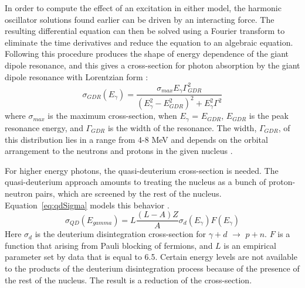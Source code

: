     In order to compute the effect of an excitation in either model, 
      the harmonic oscillator solutions found earlier can be driven by an 
      interacting force.
    The resulting differential equation can then be solved using a Fourier 
      transform to eliminate the time derivatives and reduce the equation to an
      algebraic equation.
    Following this procedure produces the shape of energy dependence of the 
      giant dipole resonance, and this gives a cross-section for photon 
      absorption by the giant dipole resonance with Lorentzian form \cite{emPCite6}:
    \begin{equation}
      \sigma_{GDR}(E_{\gamma})=\frac{\sigma_{max}E_{\gamma}\Gamma_{GDR}^{2}}
      {\left(E_{\gamma}^{2}-E_{GDR}^{2}\right)^{2}+E_{\gamma}^{2}\Gamma^{2}}
      \label{eq:gdrRes}
    \end{equation}
      where $\sigma_{max}$ is the maximum cross-section, when $E_{\gamma}$ = 
      $E_{GDR}$, $E_{GDR}$ is the peak resonance energy, and $\Gamma_{GDR}$ is 
      the width of the resonance.
    The width, $\Gamma_{GDR}$, of this distribution lies in a range from 4-8 
      MeV and depends on the orbital arrangement to the neutrons and protons in
      the given nucleus \cite{emPCite6}.
    
    For higher energy photons, the quasi-deuterium cross-section is needed.
    The quasi-deuterium approach amounts to treating the nucleus as a bunch of 
      proton-neutron pairs, which are screened by the rest of the nucleus.
    Equation~\ref{eq:qdSigma} models this behavior \cite{emPCite4}.
    \begin{equation}
      \sigma_{QD}(E_{gamma})=L\frac{(L-A)Z}{A}\sigma_{d}(E_{\gamma})F(E_{\gamma})
      \label{eq:qdSigma}
    \end{equation}
    Here $\sigma_{d}$ is the deuterium disintegration cross-section for 
      $\gamma+d$ $\rightarrow$ $p+n$.
    $F$ is a function that arising from Pauli blocking of fermions, and $L$ is 
      an empirical parameter set by data that is equal to 6.5.
    Certain energy levels are not available to the products of the deuterium 
      disintegration process because of the presence of the rest of the nucleus.
    The result is a reduction of the cross-section.
    
